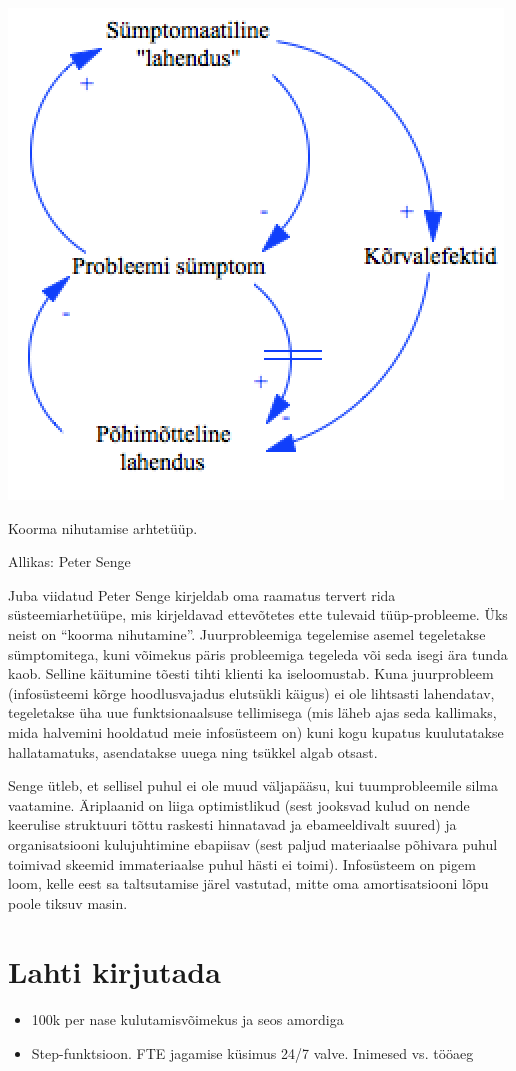 \begin{marginfigure}
	\begin{center}
		\includegraphics[width=\linewidth]{shiftingburden.png}
		\caption{Koorma nihutamise arhtetüüp.}
		Allikas: Peter Senge
		\label{fig:shifting}
	\end{center}
\end{marginfigure}

Juba viidatud Peter Senge kirjeldab oma raamatus\cite{senge19905th} tervert rida süsteemiarhetüüpe, mis kirjeldavad ettevõtetes ette tulevaid tüüp-probleeme. Üks neist on \enquote{koorma nihutamine}. Juurprobleemiga tegelemise asemel tegeletakse sümptomitega, kuni võimekus päris probleemiga tegeleda või seda isegi ära tunda kaob. Selline käitumine tõesti tihti klienti ka iseloomustab. Kuna juurprobleem (infosüsteemi kõrge hoodlusvajadus elutsükli käigus) ei ole lihtsasti lahendatav, tegeletakse üha uue funktsionaalsuse tellimisega (mis läheb ajas seda kallimaks, mida halvemini hooldatud meie infosüsteem on) kuni kogu kupatus kuulutatakse hallatamatuks, asendatakse uuega ning tsükkel algab otsast.

Senge ütleb, et sellisel puhul ei ole muud väljapääsu, kui tuumprobleemile silma vaatamine. Äriplaanid on liiga optimistlikud (sest jooksvad kulud on nende keerulise struktuuri tõttu raskesti hinnatavad ja ebameeldivalt suured) ja organisatsiooni kulujuhtimine ebapiisav (sest paljud materiaalse põhivara puhul toimivad skeemid immateriaalse puhul hästi ei toimi). Infosüsteem on pigem loom, kelle eest sa taltsutamise järel vastutad, mitte oma amortisatsiooni lõpu poole tiksuv masin.

\section{Lahti kirjutada}
\begin{itemize}
	\item 100k per nase kulutamisvõimekus ja seos amordiga
	\item Step-funktsioon. FTE jagamise küsimus 24/7 valve. Inimesed vs. tööaeg
\end{itemize}
